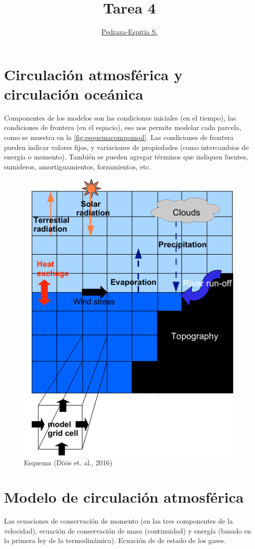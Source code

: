 \documentclass{article}
\title{Tarea 4}
\author{
\href{https://pedraza-espitia.github.io/modnum/}
{Pedraza-Espitia S.}}
\date{}
\numberwithin{figure}{section}
\numberwithin{equation}{section} %
\begin{document}
\maketitle

\section{Circulación atmosférica y circulación oceánica}
Componentes de los modelos son las condiciones iniciales (en el tiempo), las condiciones de frontera (en el espacio),  eso nos permite modelar cada parcela, como se muestra en la \autoref{fig:esquemacompomod}.
Las condiciones de frontera pueden indicar valores fijos, y variaciones de propiedades (como intercambios de energía o momento).
También se pueden agregar términos que indiquen fuentes, sumideros, amortiguamientos, forzamientos, etc.

\begin{figure}[htp]
\centering
\includegraphics[scale=.4]{figs/t4inciso_1.png}
\caption{Esquema (D\"o\"os et. al., 2016)}
\label{fig:esquemacompomod}
\end{figure}

\section{Modelo de circulación atmosférica}
Las ecuaciones de conservación de momento (en las tres componentes de la velocidad),
ecuación de conservación de masa (continuidad) y energía (basado en la primera ley de la termodinámica).
Ecuación de de estado de los gases.
\end{document}
